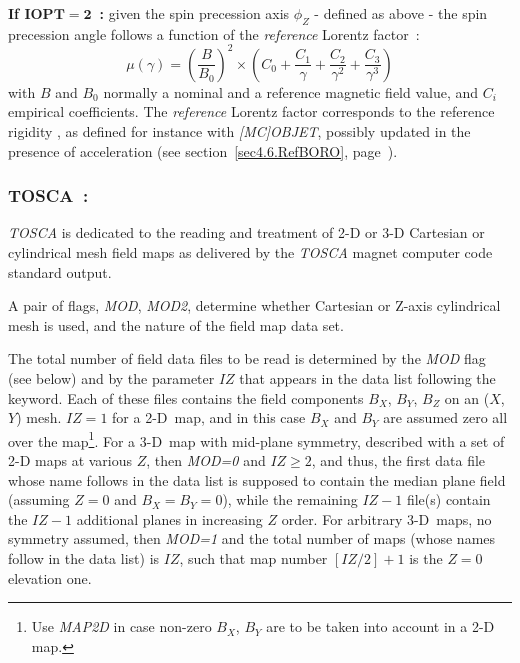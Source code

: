 \bigskip

\noindent \textbf{If $\mathbf{IOPT  =  2}$~:}  given the spin precession axis $\phi_Z$ - defined as  above -  
   the spin precession angle follows a function of the \textsl{reference} Lorentz factor~: 
  $$\mu (\gamma) = \left(\frac{B}{B_0}\right)^2 \times \left( C_0 + \frac{C_1}{\gamma} + \frac{C_2}{\gamma^2}  + \frac{C_3}{\gamma^3} \right) $$
 with $B$ and $B_0$ normally  a nominal and a reference magnetic field value, and $C_i$ empirical coefficients. 
The \textsl{reference} Lorentz factor corresponds to the reference rigidity 
 \BORO, as defined for instance with \textsl{[MC]OBJET}, possibly updated in the presence of acceleration 
(see section~\ref{sec4.6.RefBORO}, page~\pageref{sec4.6.RefBORO}). 

\newpage

\subsubsection*{TOSCA~: \TOSCATitl} \label{TOSCA} 
\medskip

 \textsl{TOSCA} is dedicated to the reading and treatment of 2-D or 
3-D Cartesian or cylindrical mesh field maps as  delivered by the
\textsl{TOSCA}  magnet computer code standard output.

\medskip

\noindent A pair of flags, \textsl{MOD}, \textsl{MOD2}, determine whether Cartesian or Z-axis cylindrical mesh is used, 
and the nature of the field map data set.

\medskip

\noindent The total number of field data files to be read is determined by the \textsl{MOD} flag 
(see below) and by the parameter $IZ$ that appears in the data list following the keyword. 
Each of these files contains the field components $B_X$, $B_Y$, $B_Z$ on an 
\mbox{($X$, $Y$)} mesh. $IZ = 1$ for a 2-D~map, and 
in this case $B_X$ and $B_Y$ are assumed  zero all over the map\footnote{Use 
\textsl{MAP2D} in case non-zero $B_X$, $B_Y$ are to be taken into account in a 2-D map.}. 
For a 3-D~map with mid-plane symmetry, described with a set of 2-D maps at various $Z$, 
then  \textsl{MOD=0} and  $IZ\ge 2$, and thus, the first 
data file whose name follows in the data list is supposed to contain the median 
plane field (assuming $ Z=0 $ and  $ B_X=B_Y=0$), while the remaining  $IZ-1$ 
file(s) contain the $IZ-1$ additional  planes in increasing $Z$ order. For arbitrary 3-D~maps, 
 no  symmetry assumed, then  \textsl{MOD=1} and  
 the total number of maps (whose names follow in the data list) 
is $IZ$, such that  map number $[IZ/2]+1$ is the $Z = 0$ elevation one.

